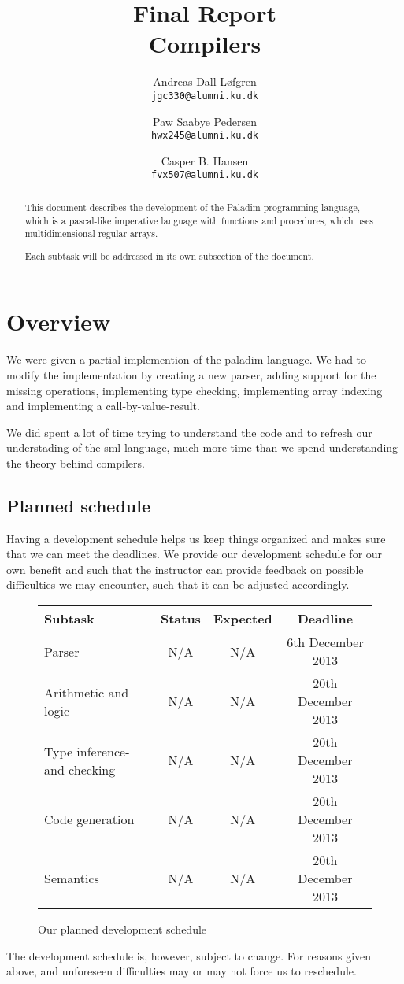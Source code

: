 \documentclass[11pt]{article}
\title%
{%
	{\large Final Report}\\
	Compilers
}
\author%
{%
	Andreas Dall Løfgren\\
	{\tt jgc330@alumni.ku.dk}
	\and
	Paw Saabye Pedersen\\
	{\tt hwx245@alumni.ku.dk}
	\and
	Casper B. Hansen\\
	{\tt fvx507@alumni.ku.dk}
}
\begin{document}
\lstset{basicstyle=\ttfamily\scriptsize}
\clearpage
\maketitle
\thispagestyle{empty}
\begin{multicols}{2}
\begin{abstract}
This document describes the development of the Paladim programming language,
which is a pascal-like imperative language with functions and procedures, which
uses multidimensional regular arrays.

Each subtask will be addressed in its own subsection of the document.
\end{abstract}
\vfill
\columnbreak%
\tableofcontents
\end{multicols}

\clearpage
\section*{Overview}
We were given a partial implemention of the paladim language. We had to modify the implementation by creating a new parser, adding support for the missing operations, implementing type checking, implementing array indexing and implementing a call-by-value-result.

We did spent a lot of time trying to understand the code and to refresh our understading of the sml language, much more time than we spend understanding the theory behind compilers.

\subsection*{Planned schedule}
Having a development schedule helps us keep things organized and makes sure that we can meet the deadlines. We provide our development schedule for our own benefit and such that the instructor can provide feedback on possible difficulties we may encounter, such that it can be  adjusted accordingly.
\begin{figure}[H]
	\centering
	\begin{tabular}{|l|c|c|c|}
		\hline
		{\bf Subtask} & {\bf Status} & {\bf Expected} & {\bf Deadline} \\ \hline
		Parser & N/A & N/A & 6th December 2013 \\ \hline
		Arithmetic and logic & N/A & N/A & 20th December 2013 \\ \hline
		Type inference- and checking & N/A & N/A & 20th December 2013 \\ \hline
		Code generation & N/A & N/A & 20th December 2013 \\ \hline
		Semantics & N/A & N/A & 20th December 2013 \\ \hline
	\end{tabular}
	\label{table:schedule}
	\caption{Our planned development schedule}
\end{figure}
The development schedule is, however, subject to change. For reasons given above, and unforeseen difficulties may or may not force us to reschedule.
\end{document}
